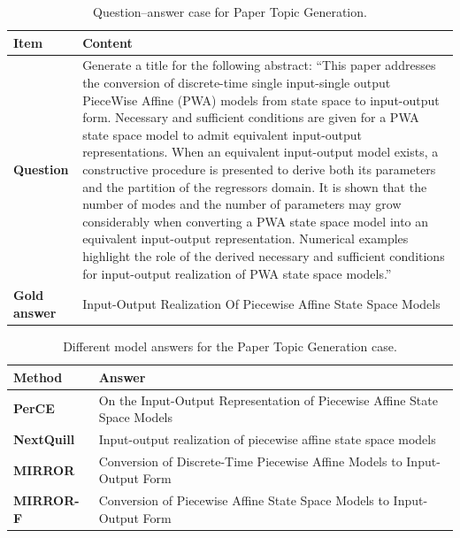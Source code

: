 \documentclass{article} %
\begin{document}
\begin{table}[t]
\centering
\small
\caption{Question--answer case for Paper Topic Generation.}
\label{tab:case_paper_qa}
\begin{tabular}{p{}p{}}
\toprule
\textbf{Item} & \textbf{Content} \\
\midrule
\textbf{Question}
&
Generate a title for the following abstract: ``This paper addresses the conversion of discrete-time single input-single output PieceWise Affine (PWA) models from state space to input-output form. Necessary and sufficient conditions are given for a PWA state space model to admit equivalent input-output representations. When an equivalent input-output model exists, a constructive procedure is presented to derive both its parameters and the partition of the regressors domain. It is shown that the number of modes and the number of parameters may grow considerably when converting a PWA state space model into an equivalent input-output representation. Numerical examples highlight the role of the derived necessary and sufficient conditions for input-output realization of PWA state space models.'' \\[2mm]

\textbf{Gold answer}
&
Input-Output Realization Of Piecewise Affine State Space Models \\
\bottomrule
\end{tabular}
\end{table}

\begin{table}[t]
\centering
\small
\caption{Different model answers for the Paper Topic Generation case.}
\label{tab:case_paper_answers}
\begin{tabular}{p{}p{}}
\toprule
\textbf{Method} & \textbf{Answer} \\
\midrule
\textbf{PerCE}
&
On the Input-Output Representation of Piecewise Affine State Space Models \\[2mm]

\textbf{NextQuill}
&
Input-output realization of piecewise affine state space models \\[2mm]

\textbf{MIRROR}
&
Conversion of Discrete-Time Piecewise Affine Models to Input-Output Form \\[2mm]

\textbf{MIRROR-F}
&
Conversion of Piecewise Affine State Space Models to Input-Output Form \\
\bottomrule
\end{tabular}
\end{table}
\end{document}
